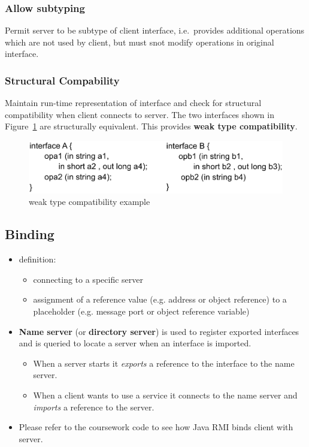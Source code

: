 \documentclass[twocolumn,landscape,10pt]{article}
\theoremstyle{definition}
\begin{document}
\subsubsection{Allow subtyping}

Permit server to be subtype of client interface, i.e.\ provides
additional operations which are not used by client, but must snot modify
operations in original interface.

\subsubsection{Structural Compability}

Maintain run-time representation of interface and check for structural
compatibility when client connects to server. The two interfaces shown in
Figure~\ref{fig:wtc} are structurally equivalent. This provides \textbf{weak
type compatibility}.

\begin{figure}[h]
  	\includegraphics[scale=0.35]{weak_type_compatibility.png}
  	\centering
    \caption{weak type compatibility example}\label{fig:wtc}
\end{figure}


\subsection{Binding}

\begin{itemize}
    \item definition:
        \begin{itemize}
            \item connecting to a specific server
            \item assignment of a reference value (e.g. address or object
                reference) to a placeholder (e.g. message port or object
                reference variable)
        \end{itemize} 
    \item \textbf{Name server} (or \textbf{directory server}) is used to
        register exported interfaces and is queried to locate a server when an
        interface is imported.
        \begin{itemize}
            \item When a server starts it \emph{exports} a reference to the
                interface to the name server.
            \item When a client wants to use a service it connects to the name
                server and \emph{imports} a reference to the server.
        \end{itemize} 
    \item Please refer to the coursework code to see how Java RMI binds client
        with server.
\end{itemize} 
\end{document}
